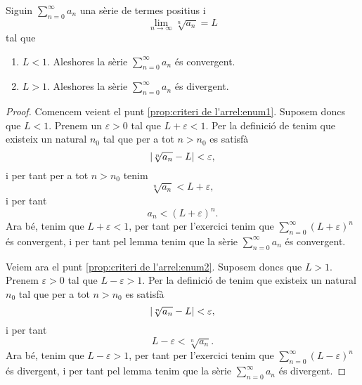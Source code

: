 \documentclass[../Apunts.tex]{subfiles}
\begin{document}
	\begin{proposition}
		\label{prop:criteri de l'arrel}
		Siguin \(\sum_{n=0}^{\infty}a_{n}\) una sèrie de termes positius i
		\[\lim_{n\to\infty}\sqrt[n]{a_{n}}=L\]
		tal que
		\begin{enumerate}
			\item\label{prop:criteri de l'arrel:enum1} \(L<1\). Aleshores la sèrie \(\sum_{n=0}^{\infty}a_{n}\) és convergent.
			\item\label{prop:criteri de l'arrel:enum2} \(L>1\). Aleshores la sèrie \(\sum_{n=0}^{\infty}a_{n}\) és divergent.
		\end{enumerate}
		\begin{proof}
			Comencem veient el punt \eqref{prop:criteri de l'arrel:enum1}.  Suposem doncs que \(L<1\). Prenem un \(\varepsilon>0\) tal que \(L+\varepsilon<1\). Per la definició de  tenim que existeix un natural \(n_{0}\) tal que per a tot \(n>n_{0}\) es satisfà
			\[\abs{\sqrt[n]{a_{n}}-L}<\varepsilon,\]
			i per tant per a tot \(n>n_{0}\) tenim
			\[\sqrt[n]{a_{n}}<L+\varepsilon,\]
			i per tant
			\[a_{n}<\left(L+\varepsilon\right)^{n}.\]
			Ara bé, tenim que \(L+\varepsilon<1\), per tant per l'exercici  tenim que \(\sum_{n=0}^{\infty}(L+\varepsilon)^{n}\) és convergent, i per tant pel lemma  tenim que la sèrie \(\sum_{n=0}^{\infty}a_{n}\) és convergent.
			
			Veiem ara el punt \eqref{prop:criteri de l'arrel:enum2}. Suposem doncs que \(L>1\). Prenem \(\varepsilon>0\) tal que \(L-\varepsilon>1\). Per la definició de  tenim que existeix un natural \(n_{0}\) tal que per a tot \(n>n_{0}\) es satisfà
			\[\abs{\sqrt[n]{a_{n}}-L}<\varepsilon,\]
			i per tant
			\[L-\varepsilon<\sqrt[n]{a_{n}}.\]
			Ara bé, tenim que \(L-\varepsilon>1\), per tant per l'exercici  tenim que \(\sum_{n=0}^{\infty}(L-\varepsilon)^{n}\) és divergent, i per tant pel lemma  tenim que la sèrie \(\sum_{n=0}^{\infty}a_{n}\) és divergent.
		\end{proof}
	\end{proposition}
\end{document}
